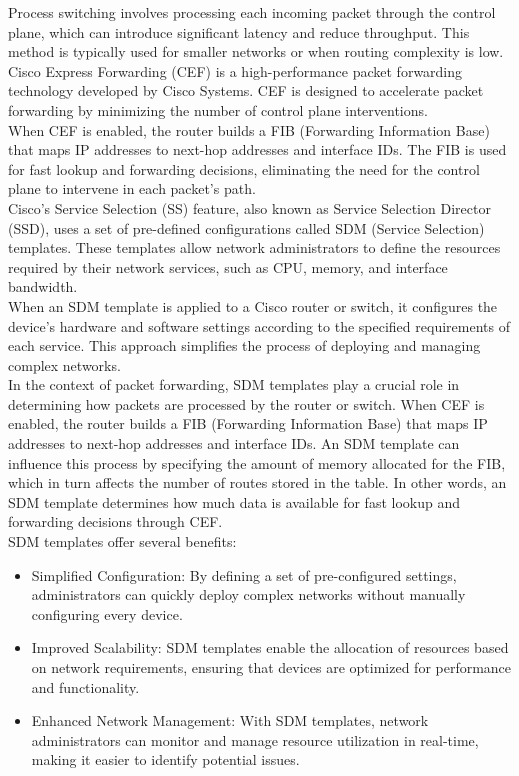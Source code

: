 \documentclass{article}
\begin{document}
Process switching involves processing each incoming packet through the control plane, which can introduce significant latency and reduce throughput. This method is typically used for smaller networks or when routing complexity is low.\\

Cisco Express Forwarding (CEF) is a high-performance packet forwarding technology developed by Cisco Systems. CEF is designed to accelerate packet forwarding by minimizing the number of control plane interventions.\\

When CEF is enabled, the router builds a FIB (Forwarding Information Base) that maps IP addresses to next-hop addresses and interface IDs. The FIB is used for fast lookup and forwarding decisions, eliminating the need for the control plane to intervene in each packet's path.\\

Cisco's Service Selection (SS) feature, also known as Service Selection Director (SSD), uses a set of pre-defined configurations called SDM (Service Selection) templates. These templates allow network administrators to define the resources required by their network services, such as CPU, memory, and interface bandwidth.\\

When an SDM template is applied to a Cisco router or switch, it configures the device's hardware and software settings according to the specified requirements of each service. This approach simplifies the process of deploying and managing complex networks.\\

In the context of packet forwarding, SDM templates play a crucial role in determining how packets are processed by the router or switch. When CEF is enabled, the router builds a FIB (Forwarding Information Base) that maps IP addresses to next-hop addresses and interface IDs. An SDM template can influence this process by specifying the amount of memory allocated for the FIB, which in turn affects the number of routes stored in the table. In other words, an SDM template determines how much data is available for fast lookup and forwarding decisions through CEF.\\

SDM templates offer several benefits:
	\begin{itemize}
		\item Simplified Configuration: By defining a set of pre-configured settings, administrators can quickly deploy complex networks without manually configuring every device.
		\item Improved Scalability: SDM templates enable the allocation of resources based on network requirements, ensuring that devices are optimized for performance and functionality. 
		\item Enhanced Network Management: With SDM templates, network administrators can monitor and manage resource utilization in real-time, making it easier to identify potential issues. 
	\end{itemize}
\end{document}
